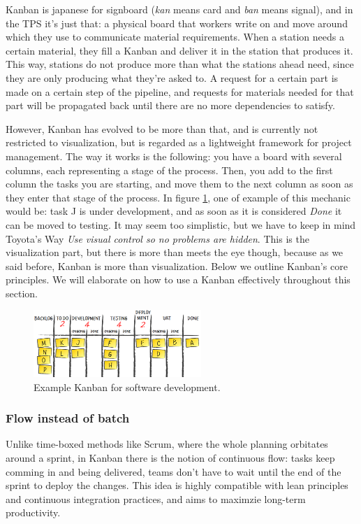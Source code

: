 \documentclass[conference]{IEEEtran}
\begin{document}
Kanban is japanese for signboard (\textit{kan} means card and \textit{ban} means signal)\cite{kanban_def}, and in
the TPS it's just that: a physical board that workers write on and move around
which they use to communicate material requirements. When a station needs a certain
material, they fill a Kanban and deliver it in the station that produces it.
This way, stations do not produce more than what the stations ahead need, since they are
only producing what they're asked to. A request for a certain part is made on a certain
step of the pipeline, and requests for materials needed for that part will be propagated back
until there are no more dependencies to satisfy.

However, Kanban has evolved to be more than that, and is currently not restricted to visualization,
but is regarded as a lightweight framework for project management. The way it works is the
following: you have a board with several columns, each representing a stage of the process.
Then, you add to the first column the tasks you are starting, and move them to the next
column as soon as they enter that stage of the process.
In figure \ref{kanban_dev}, one of example of this mechanic would be: task J is under
development, and as soon as it is considered \textit{Done} it can be moved to testing.
 It may seem too simplistic, but we have to keep in mind Toyota's Way \textit{Use visual control so no problems are
hidden}. This is the visualization part, but there is more than meets the eye though, because as we said before,
Kanban is more than visualization. Below we outline Kanban's core principles.
We will elaborate on how to use a Kanban effectively throughout this section.

\begin{figure}[!t]
\centering
\includegraphics[width=2.5in]{kanban-board}
\caption{Example Kanban for software development.\cite{kanban_fig}}
\label{kanban_dev}
\end{figure}

\subsubsection{Flow instead of batch}
Unlike time-boxed methods like Scrum, where the whole planning orbitates around
a sprint, in Kanban there is the notion of continuous flow: tasks keep comming
in and being delivered, teams don't have to wait until the end of the sprint
to deploy the changes. This idea is highly compatible with lean principles and
continuous integration practices, and aims to maximzie long-term productivity.
\end{document}
